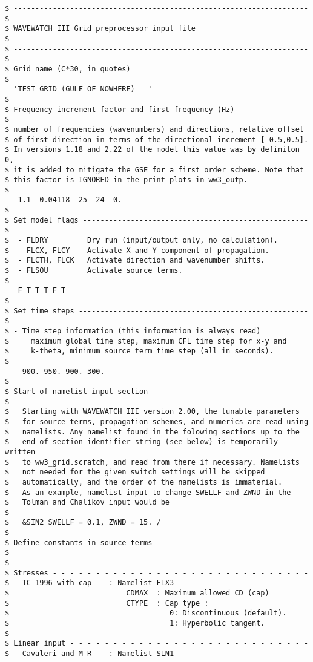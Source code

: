 \begin{verbatim}
$ -------------------------------------------------------------------- $
$ WAVEWATCH III Grid preprocessor input file                           $
$ -------------------------------------------------------------------- $
$ Grid name (C*30, in quotes)
$
  'TEST GRID (GULF OF NOWHERE)   '
$
$ Frequency increment factor and first frequency (Hz) ---------------- $
$ number of frequencies (wavenumbers) and directions, relative offset
$ of first direction in terms of the directional increment [-0.5,0.5].
$ In versions 1.18 and 2.22 of the model this value was by definiton 0,
$ it is added to mitigate the GSE for a first order scheme. Note that
$ this factor is IGNORED in the print plots in ww3_outp.
$
   1.1  0.04118  25  24  0.
$
$ Set model flags ---------------------------------------------------- $
$  - FLDRY         Dry run (input/output only, no calculation).
$  - FLCX, FLCY    Activate X and Y component of propagation.
$  - FLCTH, FLCK   Activate direction and wavenumber shifts.
$  - FLSOU         Activate source terms.
$
   F T T T F T
$
$ Set time steps ----------------------------------------------------- $
$ - Time step information (this information is always read)
$     maximum global time step, maximum CFL time step for x-y and
$     k-theta, minimum source term time step (all in seconds).
$
    900. 950. 900. 300.
$
$ Start of namelist input section ------------------------------------ $
$   Starting with WAVEWATCH III version 2.00, the tunable parameters
$   for source terms, propagation schemes, and numerics are read using
$   namelists. Any namelist found in the folowing sections up to the
$   end-of-section identifier string (see below) is temporarily written
$   to ww3_grid.scratch, and read from there if necessary. Namelists
$   not needed for the given switch settings will be skipped
$   automatically, and the order of the namelists is immaterial.
$   As an example, namelist input to change SWELLF and ZWND in the
$   Tolman and Chalikov input would be
$
$   &SIN2 SWELLF = 0.1, ZWND = 15. /
$
$ Define constants in source terms ----------------------------------- $
$
$ Stresses - - - - - - - - - - - - - - - - - - - - - - - - - - - - - -
$   TC 1996 with cap    : Namelist FLX3
$                           CDMAX  : Maximum allowed CD (cap)
$                           CTYPE  : Cap type :
$                                     0: Discontinuous (default).
$                                     1: Hyperbolic tangent.
$
$ Linear input - - - - - - - - - - - - - - - - - - - - - - - - - - - -
$   Cavaleri and M-R    : Namelist SLN1

\end{verbatim}
